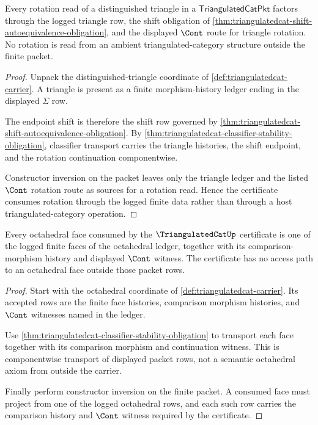 \begin{theorem}
\label{thm:triangulatedcat-distinguished-triangle-rotation-obligation}
Every rotation read of a distinguished triangle in a
$\mathsf{TriangulatedCatPkt}$ factors through the logged triangle row, the
shift obligation of
\autoref{thm:triangulatedcat-shift-autoequivalence-obligation}, and the
displayed $\Cont$ route for triangle rotation. No rotation is read from an
ambient triangulated-category structure outside the finite packet.
\end{theorem}
\begin{proof}
Unpack the distinguished-triangle coordinate of
\autoref{def:triangulatedcat-carrier}. A triangle is present as a finite
morphism-history ledger ending in the displayed $\Sigma$ row.

The endpoint shift is therefore the shift row governed by
\autoref{thm:triangulatedcat-shift-autoequivalence-obligation}. By
\autoref{thm:triangulatedcat-classifier-stability-obligation}, classifier
transport carries the triangle histories, the shift endpoint, and the rotation
continuation componentwise.

Constructor inversion on the packet leaves only the triangle ledger and the
listed $\Cont$ rotation route as sources for a rotation read. Hence the
certificate consumes rotation through the logged finite data rather than
through a host triangulated-category operation.
\end{proof}

\begin{theorem}
\label{thm:triangulatedcat-octahedral-cont-face-coverage}
Every octahedral face consumed by the $\TriangulatedCatUp$ certificate is one
of the logged finite faces of the octahedral ledger, together with its
comparison-morphism history and displayed $\Cont$ witness. The certificate has
no access path to an octahedral face outside those packet rows.
\end{theorem}
\begin{proof}
Start with the octahedral coordinate of
\autoref{def:triangulatedcat-carrier}. Its accepted rows are the finite face
histories, comparison morphism histories, and $\Cont$ witnesses named in the
ledger.

Use \autoref{thm:triangulatedcat-classifier-stability-obligation} to transport
each face together with its comparison morphism and continuation witness. This
is componentwise transport of displayed packet rows, not a semantic
octahedral axiom from outside the carrier.

Finally perform constructor inversion on the finite packet. A consumed face
must project from one of the logged octahedral rows, and each such row carries
the comparison history and $\Cont$ witness required by the certificate.
\end{proof}

